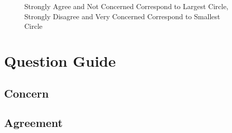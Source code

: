 \documentclass{article}%
\begin{document}

\newpage
\begin{figure}[H]
  \center
  \caption*{\tiny Strongly Agree and Not Concerned Correspond to Largest Circle, Strongly Disagree and Very Concerned Correspond to Smallest Circle}
  \resizebox{!}{0.45\textwidth}{
    \texttt{[image: ]}
  }
\end{figure}
\section*{\small Question Guide}
\subsection*{\small Concern}
{\small

}
\subsection*{\small Agreement}
{\small

}
\end{document}
